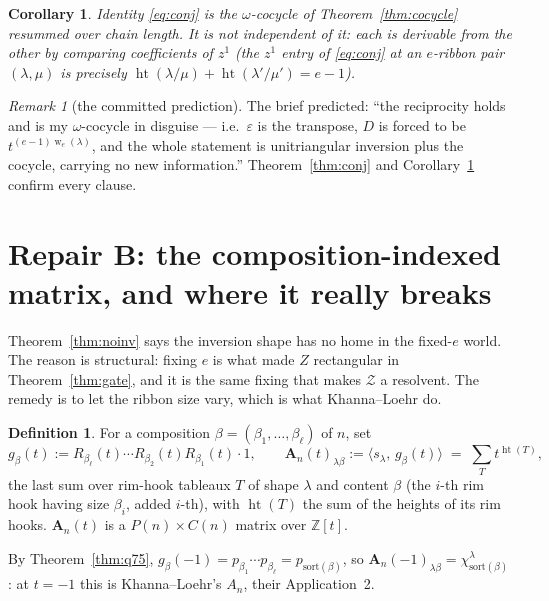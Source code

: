 \documentclass[11pt]{article}
\newtheorem{corollary}[theorem]{Corollary}
\theoremstyle{definition}
\newtheorem{definition}[theorem]{Definition}
\theoremstyle{remark}
\newtheorem{remark}[theorem]{Remark}
\newcommand{\Z}{\mathbb{Z}}
\newcommand{\hgt}{\operatorname{ht}}
\newcommand{\wgt}{\operatorname{w}}
\newcommand{\Zc}{\mathcal{Z}}
\newcommand{\Amat}{\mathbf{A}}
\begin{document}
\begin{corollary}\label{cor:nonews}
Identity \eqref{eq:conj} is the $\omega$-cocycle of Theorem~\ref{thm:cocycle} resummed over
chain length.  It is not independent of it: each is derivable from the other by comparing
coefficients of $z^1$ (the $z^1$ entry of \eqref{eq:conj} at an $e$-ribbon pair
$(\lambda,\mu)$ is precisely $\hgt(\lambda/\mu)+\hgt(\lambda'/\mu')=e-1$).
\end{corollary}

\begin{remark}[the committed prediction]
The brief predicted: ``the reciprocity holds and is my $\omega$-cocycle in disguise --- i.e.\
$\varepsilon$ is the transpose, $D$ is forced to be $t^{(e-1)\wgt_e(\lambda)}$, and the whole
statement is unitriangular inversion plus the cocycle, carrying no new information.''
Theorem~\ref{thm:conj} and Corollary~\ref{cor:nonews} confirm every clause.
\end{remark}

\section{Repair B: the composition-indexed matrix, and where it really breaks}\label{sec:comp}

Theorem~\ref{thm:noinv} says the inversion shape has no home in the fixed-$e$ world.  The
reason is structural: fixing $e$ is what made $Z$ rectangular in Theorem~\ref{thm:gate}, and
it is the same fixing that makes $\Zc$ a resolvent.  The remedy is to let the ribbon size
vary, which is what Khanna--Loehr do.

\begin{definition}\label{def:Amat}
For a composition $\beta=(\beta_1,\dots,\beta_\ell)$ of $n$, set
\[
  g_\beta(t):=R_{\beta_\ell}(t)\cdots R_{\beta_2}(t)R_{\beta_1}(t)\cdot 1,
  \qquad
  \Amat_n(t)_{\lambda\beta}:=\langle s_\lambda,\,g_\beta(t)\rangle
  \;=\;\sum_{T}t^{\hgt(T)},
\]
the last sum over rim-hook tableaux $T$ of shape $\lambda$ and content $\beta$ (the $i$-th
rim hook having size $\beta_i$, added $i$-th), with $\hgt(T)$ the sum of the heights of its
rim hooks.  $\Amat_n(t)$ is a $P(n)\times C(n)$ matrix over $\Z[t]$.
\end{definition}

By Theorem~\ref{thm:q75}, $g_\beta(-1)=p_{\beta_1}\cdots p_{\beta_\ell}=p_{\mathrm{sort}(\beta)}$,
so $\Amat_n(-1)_{\lambda\beta}=\chi^{\lambda}_{\mathrm{sort}(\beta)}$: at $t=-1$ this is
Khanna--Loehr's $A_n$, their Application~2.
\end{document}
